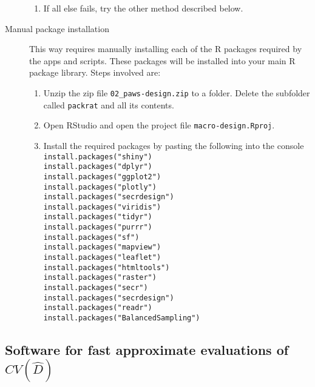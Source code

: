\documentclass[a4paper,11pt, draft]{article} %
\begin{document}
\begin{description}
\begin{enumerate}
\item If all else fails, try the other method described below.
\end{enumerate}
\item[Manual package installation] This way requires manually installing each of the R packages required by the apps and scripts. These packages will be installed into your main R package library. Steps involved are:
\begin{enumerate}
\item Unzip the zip file \verb!02_paws-design.zip! to a folder. Delete the subfolder called \texttt{packrat} and all its contents. 
\item Open RStudio and open the project file \texttt{macro-design.Rproj}.
\item Install the required packages by pasting the following into the console
\\[1em]
\texttt{install.packages("shiny")} \\
\texttt{install.packages("dplyr")} \\
\texttt{install.packages("ggplot2")} \\
\texttt{install.packages("plotly")} \\
\texttt{install.packages("secrdesign")} \\
\texttt{install.packages("viridis")} \\
\texttt{install.packages("tidyr")} \\
\texttt{install.packages("purrr")} \\
\texttt{install.packages("sf")} \\
\texttt{install.packages("mapview")} \\
\texttt{install.packages("leaflet")} \\
\texttt{install.packages("htmltools")} \\
\texttt{install.packages("raster")} \\
\texttt{install.packages("secr")} \\
\texttt{install.packages("secrdesign")} \\
\texttt{install.packages("readr")} \\
\texttt{install.packages("BalancedSampling")} 
\end{enumerate}
\end{description}

\subsection{Software for fast approximate evaluations of $CV(\hat{D})$}
\end{document}
